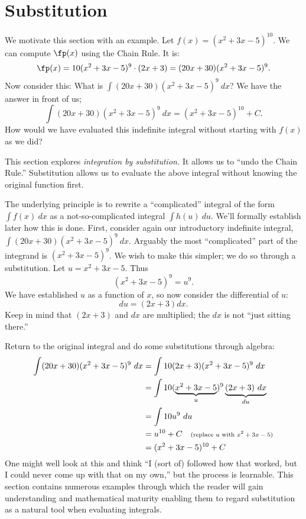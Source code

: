 \section{Substitution}\label{sec:substitution}

We motivate this section with an example. Let $f(x) = (x^2+3x-5)^{10}$. We can compute $\fp(x)$ using the Chain Rule. It is:
\[\fp(x) = 10(x^2+3x-5)^9\cdot(2x+3) = (20x+30)(x^2+3x-5)^9.\]
Now consider this: What is $\int (20x+30)(x^2+3x-5)^9\ dx$? We have the answer in front of us;
\[\int (20x+30)(x^2+3x-5)^9\ dx = (x^2+3x-5)^{10}+C.\]
How would we have evaluated this indefinite integral without starting with $f(x)$ as we did?

This section explores \emph{integration by substitution.} It allows us to ``undo the Chain Rule.'' Substitution allows us to evaluate the above integral without knowing the original function first.

The underlying principle is to rewrite a ``complicated'' integral of the form $\int f(x)\ dx$ as a not-so-complicated integral $\int h(u)\ du$. We'll formally establish later how this is done. First, consider again our introductory indefinite integral, $\int (20x+30)(x^2+3x-5)^9\ dx$. Arguably the most ``complicated'' part of the integrand is $(x^2+3x-5)^9$. We wish to make this simpler; we do so through a substitution. Let $u=x^2+3x-5$. Thus
\[(x^2+3x-5)^9 = u^9.\]
We have established $u$ as a function of $x$, so now consider the differential of $u$:
\[du = (2x+3)dx.\]
Keep in mind that $(2x+3)$ and $dx$ are multiplied; the $dx$ is not ``just sitting there.''

Return to the original integral and do some substitutions through algebra:
\begin{align*}
	\int (20x+30)(x^2+3x-5)^9\ dx
	&=	\int 10(2x+3)(x^2+3x-5)^9\ dx \\
	&=\int 10(\underbrace{x^2+3x-5}_u)^9\underbrace{(2x+3)\ dx}_{du} \\
	&=\int 10u^9\ du \\
	&= u^{10} + C \quad \text{\scriptsize (replace $u$ with $x^2+3x-5$)}\\
	&= (x^2+3x-5)^{10} +C
\end{align*}
One might well look at this and think ``I (sort of) followed how that worked, but I could never come up with that on my own,'' but the process is learnable. This section contains numerous examples through which the reader will gain understanding and mathematical maturity enabling them to regard substitution as a natural tool when evaluating integrals.

